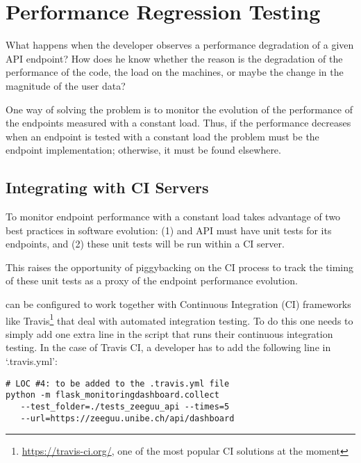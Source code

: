 


\newpage
  \section{Performance Regression Testing}

  What happens when the developer observes a performance degradation of a given API endpoint? How does he know whether the reason is the degradation of the performance of the code, the load on the machines, or maybe the change in the magnitude of the user data?

  \vspace{0.1cm}

  One way of solving the problem is to monitor the evolution of the performance of the endpoints measured with a constant load. Thus, if the performance decreases when an endpoint is tested with a constant load the problem must be the endpoint implementation; otherwise, it must be found elsewhere. 

  \subsection*{Integrating with CI Servers}

  To monitor endpoint performance with a constant load \tool takes advantage of two best practices in software evolution: (1) and API must have unit tests for its endpoints, and (2) these unit tests will be run within a CI server.

  This raises the opportunity of piggybacking on the CI process to track the timing of these unit tests as a proxy of the endpoint performance evolution. 

  

  \tool can be configured to work together with Continuous Integration (CI) frameworks like Travis\footnote{\url{https://travis-ci.org/}, one of the most popular CI solutions at the moment} that deal with automated integration testing. To do this one needs to simply add one extra line in the script that runs their continuous integration testing. In the case of Travis CI, a developer has to add the following line in `.travis.yml': 


  \begin{lstlisting}[style=custompython]  
# LOC #4: to be added to the .travis.yml file
python -m flask_monitoringdashboard.collect
   --test_folder=./tests_zeeguu_api --times=5 
   --url=https://zeeguu.unibe.ch/api/dashboard

  \end{lstlisting}

